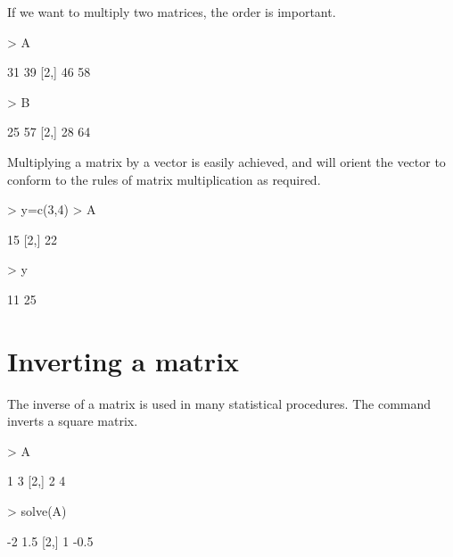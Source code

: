If we want to multiply two matrices, the order is important. 
\begin{Schunk}
\begin{Sinput}
> A%*%B 
\end{Sinput}
\begin{Soutput}
     [,1] [,2]
[1,]   31   39
[2,]   46   58
\end{Soutput}
\begin{Sinput}
> B%*%A 
\end{Sinput}
\begin{Soutput}
     [,1] [,2]
[1,]   25   57
[2,]   28   64
\end{Soutput}
\end{Schunk}
 
Multiplying a matrix by a vector is easily achieved, and \R{} will orient the vector to conform to the rules of matrix multiplication as required. 
\begin{Schunk}
\begin{Sinput}
> y=c(3,4) 
> A%*%y 
\end{Sinput}
\begin{Soutput}
     [,1]
[1,]   15
[2,]   22
\end{Soutput}
\begin{Sinput}
> y%*%A 
\end{Sinput}
\begin{Soutput}
     [,1] [,2]
[1,]   11   25
\end{Soutput}
\end{Schunk}
 
\section{Inverting a matrix} 
 
The inverse of a matrix is used in many statistical procedures. The  command inverts a square matrix. 
\begin{Schunk}
\begin{Sinput}
> A 
\end{Sinput}
\begin{Soutput}
     [,1] [,2]
[1,]    1    3
[2,]    2    4
\end{Soutput}
\begin{Sinput}
> solve(A) 
\end{Sinput}
\begin{Soutput}
     [,1] [,2]
[1,]   -2  1.5
[2,]    1 -0.5
\end{Soutput}
\end{Schunk}
 

